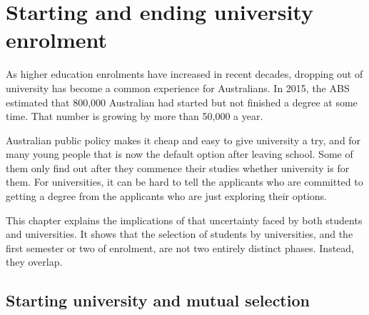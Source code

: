 \chapter{Starting and ending university enrolment} \label{chap:1}


As higher education enrolments have increased in recent decades, dropping out of university has become a common experience for Australians. In 2015, the ABS estimated that 800,000 Australian had started but not finished a degree at some time. That number is growing by more than 50,000 a year.

Australian public policy makes it cheap and easy to give university a try, and for many young people that is now the default option after leaving school. Some of them only find out after they commence their studies whether university is for them. For universities, it can be hard to tell the applicants who are committed to getting a degree from the applicants who are just exploring their options.

This chapter explains the implications of that uncertainty faced by both students and universities. It shows that the selection of students by universities, and the first semester or two of enrolment, are not two entirely distinct phases. Instead, they overlap.

\section{Starting university and mutual selection }\label{sec:1.1}


